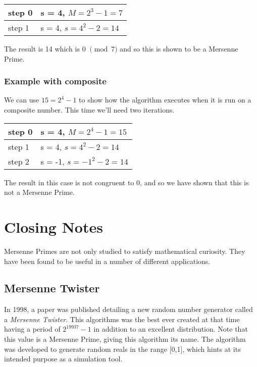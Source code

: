 \begin{tabular}{ll}
step 0&s = 4, $M = 2^3 -1 = 7$\\\hline
step 1&s = 4, $s = 4^2 - 2 = 14$
\end{tabular}

The result is 14 which is 0 $\pmod{7}$ and so this is shown to be a Mersenne Prime.

\subsubsection{Example with composite} 

We can use $15 = 2^4 - 1$ to show how the algorithm executes when it is run on a composite number. This time  we'll need two iterations.

\begin{tabular}{ll}
step 0&s = 4, $M = 2^4 -1 = 15$\\\hline
step 1&s = 4, $s = 4^2 -2 = 14$\\
step 2&s = -1, $s = -1^2 -2 = 14$
\end{tabular}

The result in this case is not congruent to 0, and so we have shown that this is not a Mersenne Prime.
\section{Closing Notes}

Mersenne Primes are not only studied to satisfy mathematical curiosity.  They have been found to be useful in a number of different applications.  

\subsection{Mersenne Twister}
In 1998, a paper was published detailing a new random number generator called a \emph{Mersenne Twister}.  This algorithms was the best ever created at that time having a period of $2^{19937} -1$ in addition to an excellent distribution\cite{mt}. Note that this value is a Mersenne Prime, giving this algorithm its name.  The algorithm was developed to generate random reals in the range [0,1], which hints at its intended purpose as a simulation tool. 

